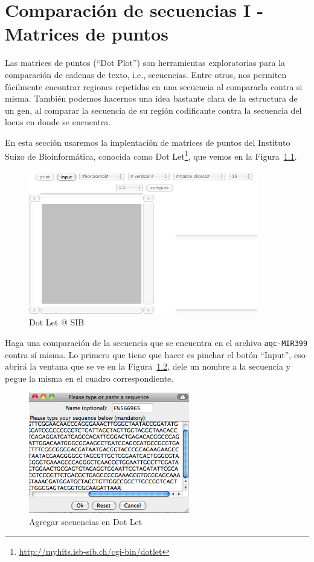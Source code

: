 \documentclass[letter,11pt]{book}
\begin{document}
\chapter{Comparación de secuencias I - Matrices de puntos}

Las matrices de puntos (``Dot Plot'') son herramientas exploratorias para la comparación de cadenas de texto, i.e., secuencias. Entre otros, nos permiten fácilmente encontrar regiones repetidas en una secuencia al compararla contra si misma. También podemos hacernos una idea bastante clara de la estructura de un gen, al comparar la secuencia de su región codificante contra la secuencia del locus en donde se encuentra.

En esta sección usaremos la implentación de matrices de puntos del Instituto Suizo de Bioinformática, conocida como  Dot Let\footnote{\url{http://myhits.isb-sib.ch/cgi-bin/dotlet}}, que vemos en la Figura~\ref{DotLet1}.

\begin{figure}[ht]
\centering
   \includegraphics[width=10cm]{Figs/DotLet1.png}
  \caption{\label{DotLet1}Dot Let @ SIB}
\end{figure}

Haga una comparación de la secuencia que se encuentra en el archivo \Verb+aqc-MIR399+ contra sí misma. Lo primero que tiene que hacer es pinchar el botón ``Input'', eso abrirá la ventana que se ve en la Figura~\ref{inputDotLet}, dele un nombre a la secuencia y pegue la misma en el cuadro correspondiente.

\begin{figure}[ht]
\centering
   \includegraphics[width=7cm]{Figs/inputDotLet.png}
  \caption{\label{inputDotLet}Agregar secuencias en Dot Let}
\end{figure}
\end{document}
